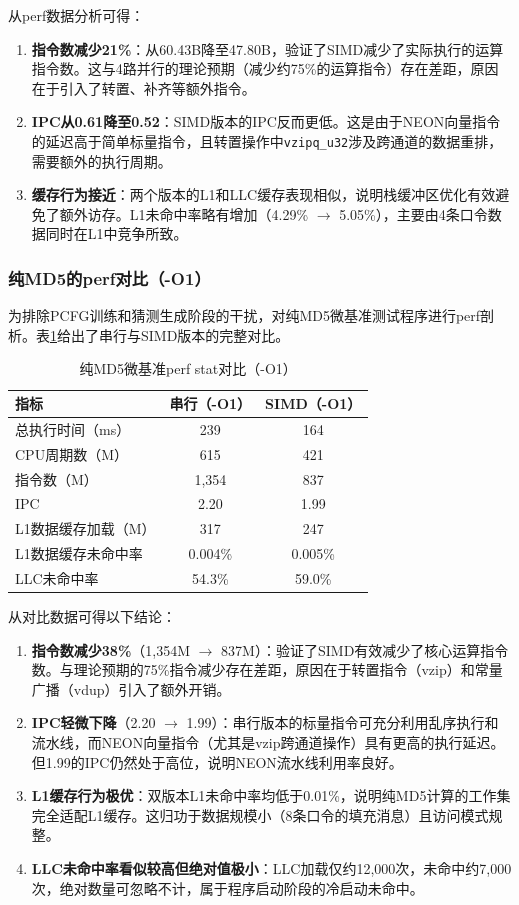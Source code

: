 \documentclass[UTF8,a4paper,10pt]{ctexart}
\begin{document}
从perf数据分析可得：

\begin{enumerate}
  \item \textbf{指令数减少21\%}：从60.43B降至47.80B，验证了SIMD减少了实际执行的运算指令数。这与4路并行的理论预期（减少约75\%的运算指令）存在差距，原因在于引入了转置、补齐等额外指令。
  \item \textbf{IPC从0.61降至0.52}：SIMD版本的IPC反而更低。这是由于NEON向量指令的延迟高于简单标量指令，且转置操作中\lstinline{vzipq_u32}涉及跨通道的数据重排，需要额外的执行周期。
  \item \textbf{缓存行为接近}：两个版本的L1和LLC缓存表现相似，说明栈缓冲区优化有效避免了额外访存。L1未命中率略有增加（4.29\% $\to$ 5.05\%），主要由4条口令数据同时在L1中竞争所致。
\end{enumerate}

\subsubsection{纯MD5的perf对比（-O1）}

为排除PCFG训练和猜测生成阶段的干扰，对纯MD5微基准测试程序进行perf剖析。表\ref{tab:perf-md5}给出了串行与SIMD版本的完整对比。

\begin{table}[!htbp]
  \centering
  \begin{tabular}{lcc}
  \toprule
  指标 & 串行（-O1） & SIMD（-O1） \\
  \midrule
  总执行时间（ms） & 239 & 164 \\
  CPU周期数（M） & 615 & 421 \\
  指令数（M） & 1,354 & 837 \\
  IPC & 2.20 & 1.99 \\
  L1数据缓存加载（M） & 317 & 247 \\
  L1数据缓存未命中率 & 0.004\% & 0.005\% \\
  LLC未命中率 & 54.3\% & 59.0\% \\
  \bottomrule
  \end{tabular}
  \caption{纯MD5微基准perf stat对比（-O1）}
  \label{tab:perf-md5}
\end{table}

从对比数据可得以下结论：

\begin{enumerate}
  \item \textbf{指令数减少38\%}（1,354M $\to$ 837M）：验证了SIMD有效减少了核心运算指令数。与理论预期的75\%指令减少存在差距，原因在于转置指令（vzip）和常量广播（vdup）引入了额外开销。
  \item \textbf{IPC轻微下降}（2.20 $\to$ 1.99）：串行版本的标量指令可充分利用乱序执行和流水线，而NEON向量指令（尤其是vzip跨通道操作）具有更高的执行延迟。但1.99的IPC仍然处于高位，说明NEON流水线利用率良好。
  \item \textbf{L1缓存行为极优}：双版本L1未命中率均低于0.01\%，说明纯MD5计算的工作集完全适配L1缓存。这归功于数据规模小（8条口令的填充消息）且访问模式规整。
  \item \textbf{LLC未命中率看似较高但绝对值极小}：LLC加载仅约12,000次，未命中约7,000次，绝对数量可忽略不计，属于程序启动阶段的冷启动未命中。

\end{enumerate}
\end{document}
